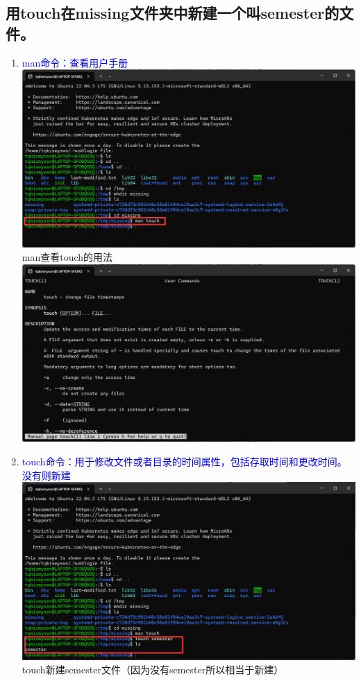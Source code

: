 \documentclass[12pt,a4paper,UTF8]{article}
\begin{document}
    \subsection{用touch在missing文件夹中新建一个叫semester的文件。}
    \begin{enumerate}
        \item \textcolor{blue}{man命令：查看用户手册}\\[8pt]
        \includegraphics[scale=0.25]{pictures/Shell/2_1.png}  
        man查看touch的用法\\[8pt]
        \includegraphics[scale=0.25]{pictures/Shell/2_2.png}
        \item \textcolor{blue}{touch命令：用于修改文件或者目录的时间属性，包括存取时间和更改时间。没有则新建}\\[8pt]
        \includegraphics[scale=0.25]{pictures/Shell/2_3.png}
        touch新建semester文件（因为没有semester所以相当于新建）
    \end{enumerate}
\end{document}
